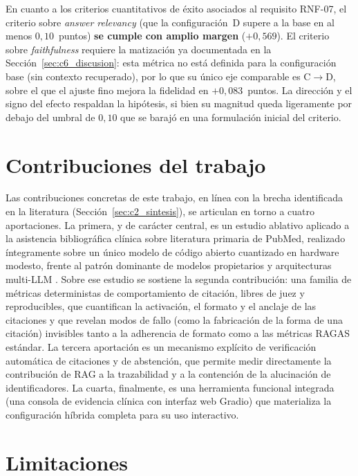 \documentclass[11pt,a4paper,spanish]{book}
\numberwithin{equation}{chapter}
\numberwithin{figure}{chapter}
\begin{document}
En cuanto a los criterios cuantitativos de éxito asociados al requisito RNF-07, el criterio sobre \textit{answer relevancy} (que la configuración~D supere a la base en al menos $0{,}10$~puntos) \textbf{se cumple con amplio margen} ($+0{,}569$). El criterio sobre \textit{faithfulness} requiere la matización ya documentada en la Sección~\ref{sec:c6_discusion}: esta métrica no está definida para la configuración base (sin contexto recuperado), por lo que su único eje comparable es C$\to$D, sobre el que el ajuste fino mejora la fidelidad en $+0{,}083$~puntos. La dirección y el signo del efecto respaldan la hipótesis, si bien su magnitud queda ligeramente por debajo del umbral de $0{,}10$ que se barajó en una formulación inicial del criterio.

\section{Contribuciones del trabajo}
\label{sec:c7_contribuciones}

Las contribuciones concretas de este trabajo, en línea con la brecha identificada en la literatura (Sección~\ref{sec:c2_sintesis}), se articulan en torno a cuatro aportaciones. La primera, y de carácter central, es un estudio ablativo aplicado a la asistencia bibliográfica clínica sobre literatura primaria de PubMed, realizado íntegramente sobre un único modelo de código abierto cuantizado en hardware modesto, frente al patrón dominante de modelos propietarios y arquitecturas multi-LLM \cite{amugongo_retrieval_2025, zakka_almanac_2024, lozano_clinfoai_2023}. Sobre ese estudio se sostiene la segunda contribución: una familia de métricas deterministas de comportamiento de citación, libres de juez y reproducibles, que cuantifican la activación, el formato y el anclaje de las citaciones y que revelan modos de fallo (como la fabricación de la forma de una citación) invisibles tanto a la adherencia de formato como a las métricas RAGAS estándar. La tercera aportación es un mecanismo explícito de verificación automática de citaciones y de abstención, que permite medir directamente la contribución de RAG a la trazabilidad y a la contención de la alucinación de identificadores. La cuarta, finalmente, es una herramienta funcional integrada (una consola de evidencia clínica con interfaz web Gradio) que materializa la configuración híbrida completa para su uso interactivo.

\section{Limitaciones}
\label{sec:c7_limitaciones}
\end{document}
